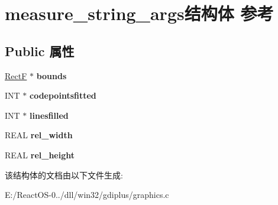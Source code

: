 \hypertarget{structmeasure__string__args}{}\section{measure\+\_\+string\+\_\+args结构体 参考}
\label{structmeasure__string__args}
\subsection*{Public 属性}
\begin{DoxyCompactItemize}
\item 
\mbox{\label{structmeasure__string__args_a9f3b3136ff1eb197b91199d141d787e4}} 
\hyperlink{struct_rect_f}{RectF} $\ast$ {\bfseries bounds}
\item 
\mbox{\label{structmeasure__string__args_a0b0296070657575da2f1978e01f1c2ae}} 
I\+NT $\ast$ {\bfseries codepointsfitted}
\item 
\mbox{\label{structmeasure__string__args_ab089fd42e52e8350491bc6f13b657139}} 
I\+NT $\ast$ {\bfseries linesfilled}
\item 
\mbox{\label{structmeasure__string__args_a0bbbd426c69f27333d7bb6d326943790}} 
R\+E\+AL {\bfseries rel\+\_\+width}
\item 
\mbox{\label{structmeasure__string__args_a4aab18d51c0b08d97f1cebd7fc1f8b62}} 
R\+E\+AL {\bfseries rel\+\_\+height}
\end{DoxyCompactItemize}


该结构体的文档由以下文件生成\+:\begin{DoxyCompactItemize}
\item 
E\+:/\+React\+O\+S-\/0../dll/win32/gdiplus/graphics.\+c\end{DoxyCompactItemize}
